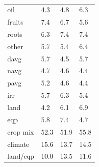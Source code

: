 \documentclass[12pt]{article}
\begin{document}
\begin{table}
{\begin{tabular}{llll}
oil & 4.3 & 4.8 & 6.3 \\
fruits & 7.4 & 6.7 & 5.6 \\
roots & 6.3 & 7.4 & 7.4 \\
other & 5.7 & 5.4 & 6.4 \\
davg & 5.7 & 4.5 & 5.7 \\
navg & 4.7 & 4.6 & 4.4 \\
pavg & 5.2 & 4.6 & 4.4 \\
irr & 5.7 & 6.3 & 5.4 \\
land & 4.2 & 6.1 & 6.9 \\
eqp & 5.8 & 7.4 & 4.7 \\
\midrule
crop mix & 52.3 & 51.9 & 55.8 \\
climate & 15.6 & 13.7 & 14.5 \\
land/eqp & 10.0 & 13.5 & 11.6 \\
\bottomrule
\end{tabular}
\caption{ }
\label{t.ny.temp_percentages}
}
\end{table}
\end{document}
